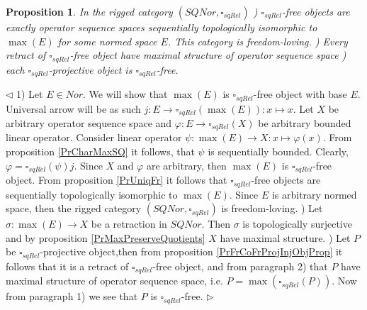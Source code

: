 \documentclass[12pt]{article}
\newtheorem{proposition}[theorem]{Proposition}
\newenvironment{proof}{\par $\triangleleft$}{$\triangleright$}
\begin{document}
\begin{proposition}\label{PrSQRelChar}
In the rigged category $(SQNor,\square_{sqRel})$
) $\square_{sqRel}$-free objects are exactly operator sequence spaces sequentially topologically isomorphic to $\max(E)$ for some normed space $E$. This category is freedom-loving. 
) Every retract of $\square_{sqRel}$-free object have maximal structure of operator sequence space
) each $\square_{sqRel}$-projective object is $\square_{sqRel}$-free.
\end{proposition}
\begin{proof}
1) Let $E\in Nor$. We will show that $\max(E)$ is $\square_{sqRel}$-free object with base $E$. Universal  arrow will be as such $j:E\to\square_{sqRel}(\max(E)):x\mapsto x$. Let $X$ be arbitrary operator sequence space and $\varphi:E\to\square_{sqRel}(X)$ be arbitrary bounded linear operator. Consider linear operator $\psi: \max(E)\to X:x\mapsto\varphi(x)$. From proposition \ref{PrCharMaxSQ} 
it follows, that $\psi$ is sequentially bounded. Clearly, $\varphi=\square_{sqRel}(\psi)j$.
Since $X$ and $\varphi$ are arbitrary, then $\max(E)$ is $\square_{sqRel}$-free object. From proposition \ref{PrUniqFr} it follows that $\square_{sqRel}$-free objects are sequentially topologically isomorphic to 
$\max(E)$. Since $E$ is arbitrary normed space, then the rigged category $(SQNor,\square_{sqRel})$ is freedom-loving.
) Let $\sigma:\max(E)\to X$ be a retraction in $SQNor$. Then $\sigma$ is topologically surjective and by proposition \ref{PrMaxPreserveQuotients} $X$ have maximal structure.
) Let $P$ be $\square_{sqRel}$-projective object,then from proposition \ref{PrFrCoFrProjInjObjProp} it follows that it is a retract of $\square_{sqRel}$-free object, and from paragraph 2) that $P$ have maximal structure of operator sequence space, i.e. $P=\max(\square_{sqRel}(P))$. Now from paragraph 1) we see that $P$ is $\square_{sqRel}$-free.  
\end{proof}
\end{document}
